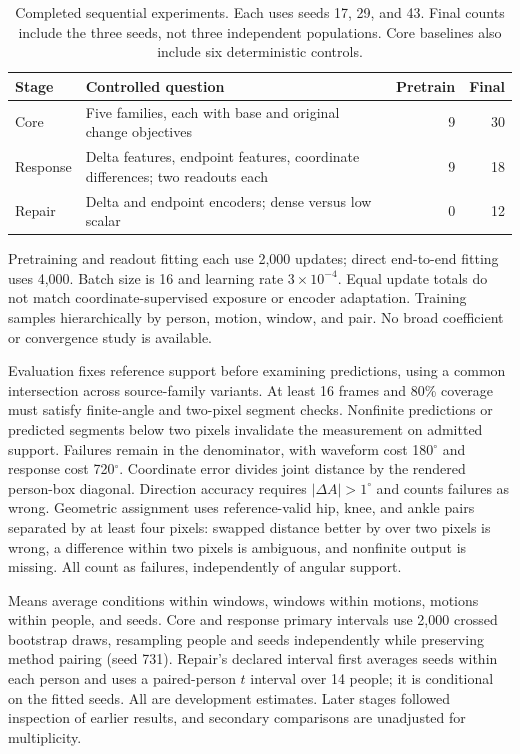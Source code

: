 \documentclass{article}
\newcommand{\degunit}{^{\circ}}
\begin{document}
\begin{table}[h]\centering\small
\caption{Completed sequential experiments. Each uses seeds 17, 29, and 43. Final counts include the three seeds, not three independent populations. Core baselines also include six deterministic controls.}
\label{tab:matrix}
\begin{tabular}{p{.85in}p{3.0in}rr}\toprule
Stage & Controlled question & Pretrain & Final\\\midrule
Core & Five families, each with base and original change objectives &9&30\\
Response & Delta features, endpoint features, coordinate differences; two readouts each &9&18\\
Repair & Delta and endpoint encoders; dense versus low scalar &0&12\\\bottomrule
\end{tabular}\end{table}

Pretraining and readout fitting each use 2,000 updates; direct end-to-end fitting uses 4,000. Batch size is 16 and learning rate $3\times10^{-4}$. Equal update totals do not match coordinate-supervised exposure or encoder adaptation. Training samples hierarchically by person, motion, window, and pair. No broad coefficient or convergence study is available.

Evaluation fixes reference support before examining predictions, using a common intersection across source-family variants. At least 16 frames and 80\% coverage must satisfy finite-angle and two-pixel segment checks. Nonfinite predictions or predicted segments below two pixels invalidate the measurement on admitted support. Failures remain in the denominator, with waveform cost 180$\degunit$ and response cost 720$\degunit$. Coordinate error divides joint distance by the rendered person-box diagonal. Direction accuracy requires $|\Delta A|>1\degunit$ and counts failures as wrong. Geometric assignment uses reference-valid hip, knee, and ankle pairs separated by at least four pixels: swapped distance better by over two pixels is wrong, a difference within two pixels is ambiguous, and nonfinite output is missing. All count as failures, independently of angular support.

Means average conditions within windows, windows within motions, motions within people, and seeds. Core and response primary intervals use 2,000 crossed bootstrap draws, resampling people and seeds independently while preserving method pairing (seed 731). Repair's declared interval first averages seeds within each person and uses a paired-person $t$ interval over 14 people; it is conditional on the fitted seeds. All are development estimates. Later stages followed inspection of earlier results, and secondary comparisons are unadjusted for multiplicity.
\end{document}
